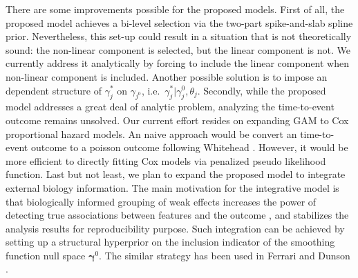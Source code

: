 \documentclass[AMA,STIX1COL,]{WileyNJD-v2}
\begin{document}
There are some improvements possible for the proposed models. First of
all, the proposed model achieves a bi-level selection via the two-part
spike-and-slab spline prior. Nevertheless, this set-up could result in a
situation that is not theoretically sound: the non-linear component is
selected, but the linear component is not. We currently address it
analytically by forcing to include the linear component when non-linear
component is included. Another possible solution is to impose an
dependent structure of \(\gamma_{j}^*\) on \(\gamma_{j^{0}}\),
i.e.~\(\gamma_j^*|\gamma_{j}^{0}, \theta_j\). Secondly, while the
proposed model addresses a great deal of analytic problem, analyzing the
time-to-event outcome remains unsolved. Our current effort resides on
expanding GAM to Cox proportional hazard models. An naive approach would
be convert an time-to-event outcome to a poisson outcome following
Whitehead \citep{Whitehead1980}. However, it would be more efficient to
directly fitting Cox models via penalized pseudo likelihood function.
Last but not least, we plan to expand the proposed model to integrate
external biology information. The main motivation for the integrative
model is that biologically informed grouping of weak effects increases
the power of detecting true associations between features and the
outcome \citep{Peterson2016}, and stabilizes the analysis results for
reproducibility purpose. Such integration can be achieved by setting up
a structural hyperprior on the inclusion indicator of the smoothing
function null space \(\boldsymbol{\gamma}^0\). The similar strategy has
been used in Ferrari and Dunson \citep{Ferrari2020}.


\end{document}
